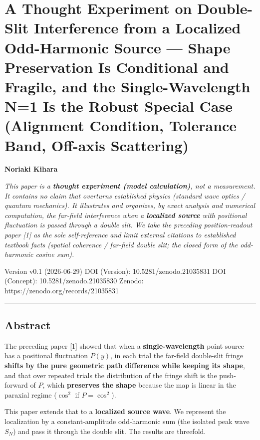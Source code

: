 \documentclass[
]{article}
\author{}
\date{}
\begin{document}
\section{A Thought Experiment on Double-Slit Interference from a
Localized Odd-Harmonic Source --- Shape Preservation Is Conditional and
Fragile, and the Single-Wavelength N=1 Is the Robust Special Case
(Alignment Condition, Tolerance Band, Off-axis
Scattering)}\label{a-thought-experiment-on-double-slit-interference-from-a-localized-odd-harmonic-source-shape-preservation-is-conditional-and-fragile-and-the-single-wavelength-n1-is-the-robust-special-case-alignment-condition-tolerance-band-off-axis-scattering}

\textbf{Noriaki Kihara}

\emph{This paper is a \textbf{thought experiment (model calculation)},
not a measurement. It contains no claim that overturns established
physics (standard wave optics / quantum mechanics). It illustrates and
organizes, by exact analysis and numerical computation, the far-field
interference when a \textbf{localized source} with positional
fluctuation is passed through a double slit. We take the preceding
position-readout paper {[}1{]} as the sole self-reference and limit
external citations to established textbook facts (spatial coherence /
far-field double slit; the closed form of the odd-harmonic cosine sum).}

Version v0.1 (2026-06-29) DOI (Version): 10.5281/zenodo.21035831 DOI
(Concept): 10.5281/zenodo.21035830 Zenodo:
https://zenodo.org/records/21035831

\begin{center}\rule{0.5\linewidth}{0.5pt}\end{center}

\subsection{Abstract}\label{abstract}

The preceding paper {[}1{]} showed that when a
\textbf{single-wavelength} point source has a positional fluctuation
\(P(y)\), in each trial the far-field double-slit fringe \textbf{shifts
by the pure geometric path difference while keeping its shape}, and that
over repeated trials the distribution of the fringe shift is the
push-forward of \(P\), which \textbf{preserves the shape} because the
map is linear in the paraxial regime (\(\cos^2\) if \(P=\cos^2\)).

This paper extends that to a \textbf{localized source wave}. We
represent the localization by a constant-amplitude odd-harmonic sum (the
isolated peak wave \(S_N\)) and pass it through the double slit. The
results are threefold.
\end{document}
